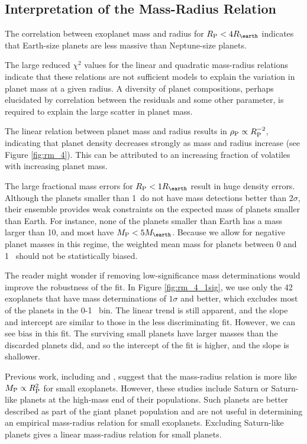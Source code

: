 \documentclass[iop]{emulateapj}
\begin{document}
\subsection{Interpretation of the Mass-Radius Relation}
The correlation between exoplanet mass and radius for $\rpl < 4 \rearth$ indicates that Earth-size planets are less massive than Neptune-size planets.

The large reduced $\chi^2$ values for the linear and quadratic mass-radius relations indicate that these relations are not sufficient models to explain the variation in planet mass at a given radius.  A diversity of planet compositions, perhaps elucidated by correlation between the residuals and some other parameter, is required to explain the large scatter in planet mass.

The linear relation between planet mass and radius results in $\rho_{\rm P} \propto R_{\rm P}^{-2}$, indicating that planet density decreases strongly as mass and radius increase (see Figure \ref{fig:rm_4}).  This can be attributed to an increasing fraction of volatiles with increasing planet mass.

The large fractional mass errors for $\rpl < 1 \rearth$ result in huge density errors.  Although the planets smaller than 1\rearth\ do not have mass detections better than 2$\sigma$, their ensemble provides weak constraints on the expected mass of planets smaller than Earth.  For instance, none of the planets smaller than Earth has a mass larger than 10\mearth, and most have $\mpl < 5\mearth$.  Because we allow for negative planet masses in this regime, the weighted mean mass for planets between 0 and 1 \rearth\ should not be statistically biased.

The reader might wonder if removing low-significance mass determinations would improve the robustness of the fit.  In Figure \ref{fig:rm_4_1sig}, we use only the 42 exoplanets that have mass determinations of $1\sigma$ and better, which excludes most of the planets in the 0-1 \rearth\ bin.  The linear trend is still apparent, and the slope and intercept are similar to those in the less discriminating fit.  However, we can see bias in this fit.  The surviving small planets have larger masses than the discarded planets did, and so the intercept of the fit is higher, and the slope is shallower.

Previous work, including \citet{Lissauer2011} and \citet{Weiss2013}, suggest that the mass-radius relation is more like $M_{\rm P} \propto R_{\rm P}^2$ for small exoplanets.  However, these studies include Saturn or Saturn-like planets at the high-mass end of their populations.  Such planets are better described as part of the giant planet population and are not useful in determining an empirical mass-radius relation for small exoplanets.  Excluding Saturn-like planets gives a linear mass-radius relation for small planets.
\end{document}
